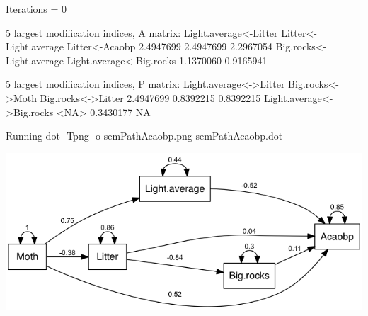 \documentclass[12pt]{article}
\begin{document}
\begin{Schunk}
\begin{Soutput}
 Iterations =  0 
\end{Soutput}
\begin{Soutput}
 5 largest modification indices, A matrix:
   Light.average<-Litter    Litter<-Light.average           Litter<-Acaobp 
               2.4947699                2.4947699                2.2967054 
Big.rocks<-Light.average Light.average<-Big.rocks 
               1.1370060                0.9165941 

  5 largest modification indices, P matrix:
   Light.average<->Litter          Big.rocks<->Moth        Big.rocks<->Litter 
                2.4947699                 0.8392215                 0.8392215 
Light.average<->Big.rocks                      <NA> 
                0.3430177                        NA 
\end{Soutput}
\begin{Soutput}
Running  dot -Tpng -o semPathAcaobp.png  semPathAcaobp.dot 
\end{Soutput}
\end{Schunk}

\includegraphics{semPathAcaobp.png}
\pagebreak
\end{document}
